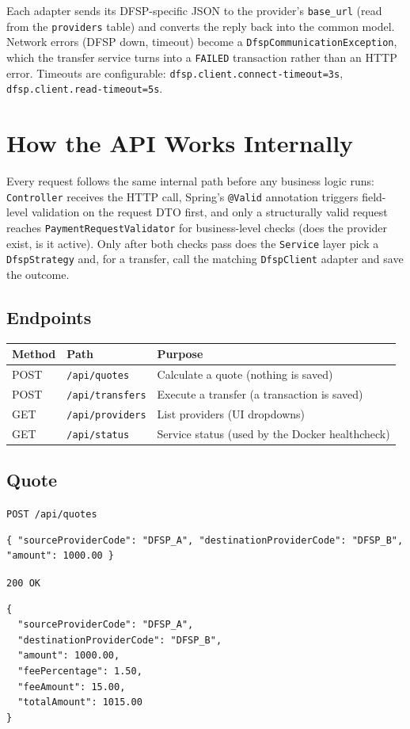 \documentclass[12pt,a4paper]{article}
\begin{document}
Each adapter sends its DFSP-specific JSON to the provider's \texttt{base\_url} (read
from the \texttt{providers} table) and converts the reply back into the common model.
Network errors (DFSP down, timeout) become a \texttt{DfspCommunicationException},
which the transfer service turns into a \texttt{FAILED} transaction rather than an
HTTP error. Timeouts are configurable: \texttt{dfsp.client.connect-timeout=3s},
\texttt{dfsp.client.read-timeout=5s}.

\clearpage
\section{How the API Works Internally}
\label{sec:api}

Every request follows the same internal path before any business logic runs:
\texttt{Controller} receives the HTTP call, Spring's \texttt{@Valid} annotation
triggers field-level validation on the request DTO first, and only a structurally
valid request reaches \texttt{PaymentRequestValidator} for business-level checks
(does the provider exist, is it active). Only after both checks pass does the
\texttt{Service} layer pick a \texttt{DfspStrategy} and, for a transfer, call the
matching \texttt{DfspClient} adapter and save the outcome.

\subsection{Endpoints}

\begin{longtable}{L{0.12\textwidth} L{0.28\textwidth} L{0.50\textwidth}}
\toprule
\textbf{Method} & \textbf{Path} & \textbf{Purpose} \\
\midrule
\endhead
POST & \texttt{/api/quotes} & Calculate a quote (nothing is saved) \\
POST & \texttt{/api/transfers} & Execute a transfer (a transaction is saved) \\
GET & \texttt{/api/providers} & List providers (UI dropdowns) \\
GET & \texttt{/api/status} & Service status (used by the Docker healthcheck) \\
\bottomrule
\end{longtable}

\subsection{Quote}
\texttt{POST /api/quotes}
\begin{lstlisting}
{ "sourceProviderCode": "DFSP_A", "destinationProviderCode": "DFSP_B", "amount": 1000.00 }
\end{lstlisting}
\texttt{200 OK}
\begin{lstlisting}
{
  "sourceProviderCode": "DFSP_A",
  "destinationProviderCode": "DFSP_B",
  "amount": 1000.00,
  "feePercentage": 1.50,
  "feeAmount": 15.00,
  "totalAmount": 1015.00
}
\end{lstlisting}
\end{document}
